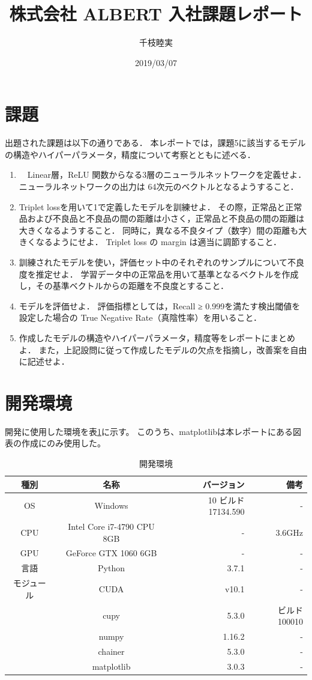\documentclass[10pt]{jarticle}
\title{株式会社 ALBERT 入社課題レポート}
\author{千枝睦実}
\date{2019/03/07}
\begin{document}
\maketitle
\section{課題}
出題された課題は以下の通りである．
本レポートでは，課題5に該当するモデルの構造やハイパーパラメータ，精度について考察とともに述べる．
\begin{enumerate}
\item　Linear層，ReLU 関数からなる3層のニューラルネットワークを定義せよ．
ニューラルネットワークの出力は 64次元のベクトルとなるようすること．
\item Triplet lossを用いて1で定義したモデルを訓練せよ．
その際，正常品と正常品および不良品と不良品の間の距離は小さく，正常品と不良品の間の距離は大きくなるようすること．
同時に，異なる不良タイプ（数字）間の距離も大きくなるようにせよ．
Triplet loss の margin は適当に調節すること．
\item 訓練されたモデルを使い，評価セット中のそれぞれのサンプルについて不良度を推定せよ．
学習データ中の正常品を用いて基準となるベクトルを作成し，その基準ベクトルからの距離を不良度とすること．
\item モデルを評価せよ．
評価指標としては，Recall ≥ 0.999を満たす検出閾値を設定した場合の True Negative Rate（真陰性率）を用いること．
\item 作成したモデルの構造やハイパーパラメータ，精度等をレポートにまとめよ．
また，上記設問に従って作成したモデルの欠点を指摘し，改善案を自由に記述せよ．
\end{enumerate}

\section{開発環境}
開発に使用した環境を表\ref{env}に示す。
このうち、matplotlibは本レポートにある図表の作成にのみ使用した。
\begin{table}[H]
\caption{開発環境}
\label{env}
\centering
\begin{tabular}{ccrr} \hline
種別 & 名称 & バージョン & 備考 \\ \hline
OS & Windows & 10 ビルド17134.590 & - \\
CPU & Intel Core i7-4790 CPU 8GB & - & 3.6GHz \\
GPU & GeForce GTX 1060 6GB & - & - \\ 
言語 & Python & 3.7.1 & - \\
モジュール & CUDA & v10.1 & - \\
 & cupy & 5.3.0 & ビルド100010 \\
 & numpy & 1.16.2 & - \\
 & chainer & 5.3.0 & - \\
 & matplotlib & 3.0.3 & - \\ \hline
\end{tabular}
\end{table}
\end{document}

